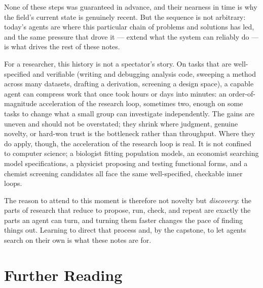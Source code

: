 None of these steps was guaranteed in advance, and their nearness in time is why the field's current state is genuinely recent.
But the sequence is not arbitrary: today's agents are where this particular chain of problems and solutions has led, and the same pressure that drove it --- extend what the system can reliably do --- is what drives the rest of these notes.

For a researcher, this history is not a spectator's story.
On tasks that are well-specified and verifiable (writing and debugging analysis code, sweeping a method across many datasets, drafting a derivation, screening a design space), a capable agent can compress work that once took hours or days into minutes: an order-of-magnitude acceleration of the research loop, sometimes two, enough on some tasks to change what a small group can investigate independently.
The gains are uneven and should not be overstated; they shrink where judgment, genuine novelty, or hard-won trust is the bottleneck rather than throughput.
Where they do apply, though, the acceleration of the research loop is real.
It is not confined to computer science; a biologist fitting population models, an economist searching model specifications, a physicist proposing and testing functional forms, and a chemist screening candidates all face the same well-specified, checkable inner loops.

The reason to attend to this moment is therefore not novelty but \emph{discovery}: the parts of research that reduce to propose, run, check, and repeat are exactly the parts an agent can turn, and turning them faster changes the pace of finding things out.
Learning to direct that process and, by the capstone, to let agents search on their own is what these notes are for.


\section*{Further Reading}

